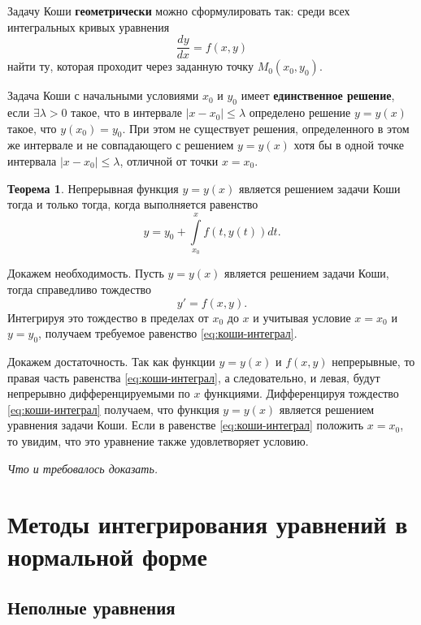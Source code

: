 \documentclass[a5paper, 11pt]{extbook}
\theoremstyle{definition}
\newtheorem{theorem}{Теорема}[chapter]
\theoremstyle{definition}
\newcommand{\newpar}{$ $\par\nobreak\ignorespaces}
\renewenvironment{proof}{{\noindent\bfseries Доказательство.}}{\smallskip\newpar \hfill\textit{Что и требовалось доказать.}}
\begin{document}
Задачу Коши \textbf{геометрически} можно сформулировать так: среди всех интегральных кривых уравнения
\begin{equation}
    \frac{dy}{dx} = f(x, y)
\end{equation}
найти ту, которая проходит через заданную точку \(M_0 (x_0, y_0)\).

Задача Коши с начальными условиями \(x_0\) и \(y_0\) имеет \textbf{единственное решение}, если \(\exists \lambda > 0\) такое, что в интервале \(|x - x_0| \leq \lambda\) определено решение \(y = y(x)\) такое, что \(y(x_0) = y_0\). При этом не существует решения, определенного в этом же интервале и не совпадающего с решением \(y = y(x)\) хотя бы в одной точке интервала \(|x - x_0| \leq \lambda\), отличной от точки \(x = x_0\).

\begin{theorem}
    Непрерывная функция \(y = y(x)\) является решением задачи Коши тогда и только тогда, когда выполняется равенство
    \begin{equation}
        \label{eq:коши-интеграл}
        y = y_0 + \int\limits_{x_0}^x f(t, y(t)) dt.
    \end{equation}

    \begin{proof}
        Докажем необходимость. Пусть \(y = y(x)\) является решением задачи Коши, тогда справедливо тождество
        \[
            y' = f(x, y).
        \]
        Интегрируя это тождество в пределах от \(x_0\) до \(x\) и учитывая условие \(x = x_0\) и \(y = y_0\), получаем требуемое равенство \eqref{eq:коши-интеграл}.

        Докажем достаточность. Так как функции \(y = y(x)\) и \(f(x, y)\) непрерывные, то правая часть равенства \eqref{eq:коши-интеграл}, а следовательно, и левая, будут непрерывно дифференцируемыми по \(x\) функциями. Дифференцируя тождество \eqref{eq:коши-интеграл} получаем, что функция \(y = y(x)\) является решением уравнения задачи Коши. Если в равенстве \eqref{eq:коши-интеграл} положить \(x = x_0\), то увидим, что это уравнение также удовлетворяет условию.
    \end{proof}
\end{theorem}

\chapter{Методы интегрирования уравнений в нормальной форме}

\section{Неполные уравнения}
\end{document}
